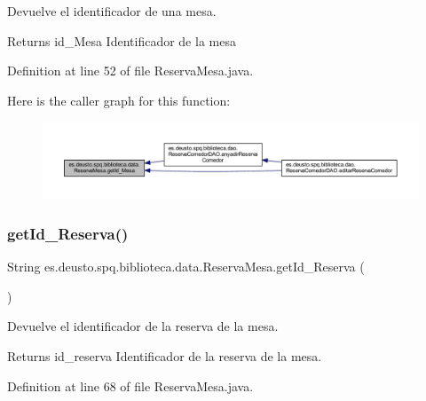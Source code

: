 Devuelve el identificador de una mesa. \begin{DoxyReturn}{Returns}
id\+\_\+\+Mesa Identificador de la mesa 
\end{DoxyReturn}


Definition at line 52 of file Reserva\+Mesa.\+java.

Here is the caller graph for this function\+:
\nopagebreak
\begin{figure}[H]
\begin{center}
\leavevmode
\includegraphics[width=350pt]{classes_1_1deusto_1_1spq_1_1biblioteca_1_1data_1_1_reserva_mesa_a648a94f9af08dec222847013a9833ff7_icgraph}
\end{center}
\end{figure}
\mbox{\label{classes_1_1deusto_1_1spq_1_1biblioteca_1_1data_1_1_reserva_mesa_a9ac2f729f34f52d30c24c36a594d25d7}} 
\subsubsection{\texorpdfstring{get\+Id\+\_\+\+Reserva()}{getId\_Reserva()}}
{\footnotesize\ttfamily String es.\+deusto.\+spq.\+biblioteca.\+data.\+Reserva\+Mesa.\+get\+Id\+\_\+\+Reserva (\begin{DoxyParamCaption}{ }\end{DoxyParamCaption})}

Devuelve el identificador de la reserva de la mesa. \begin{DoxyReturn}{Returns}
id\+\_\+reserva Identificador de la reserva de la mesa. 
\end{DoxyReturn}


Definition at line 68 of file Reserva\+Mesa.\+java.

